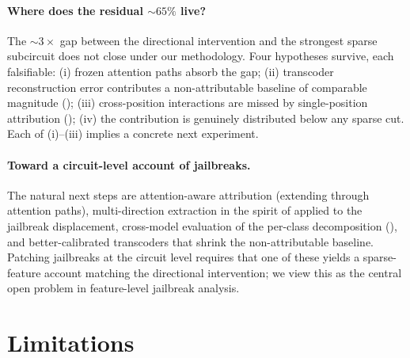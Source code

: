\documentclass{article}
\begin{document}
\paragraph{Where does the residual $\sim 65\%$ live?} The $\sim
3\times$ gap between the directional intervention and the strongest
sparse subcircuit does not close under our methodology. Four
hypotheses survive, each falsifiable: (i) frozen attention paths
absorb the gap; (ii) transcoder reconstruction error contributes a
non-attributable baseline of comparable magnitude
(); (iii) cross-position interactions are
missed by single-position attribution ();
(iv) the contribution is genuinely distributed below any sparse cut.
Each of (i)--(iii) implies a concrete next experiment.

\paragraph{Toward a circuit-level account of jailbreaks.} The
natural next steps are attention-aware attribution (extending
 through attention paths),
multi-direction extraction in the spirit of
\citet{piras2026som,wollschlager2025geometry} applied to the
jailbreak displacement, cross-model evaluation of the per-class
decomposition (), and better-calibrated transcoders
that shrink the non-attributable baseline. Patching jailbreaks at
the circuit level requires that one of these yields a sparse-feature
account matching the directional intervention; we view this as the
central open problem in feature-level jailbreak analysis.

\section{Limitations}
\label{sec:limitations}
\end{document}
